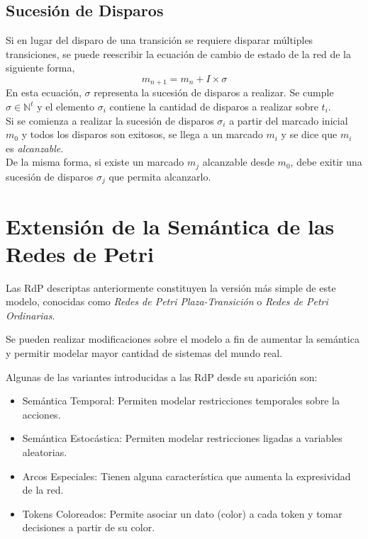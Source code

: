 \subsection{Sucesión de Disparos}

Si en lugar del disparo de una transición se requiere disparar múltiples
transiciones, se puede reescribir la ecuación de cambio de estado de la red de
la siguiente forma,
$$ m_{n+1} = m_{n} + I \times \sigma $$
En esta ecuación, $\sigma$ representa la sucesión de disparos a realizar. Se
cumple $\sigma \in \mathbb{N}^{t}$ y el elemento $\sigma_{i}$ contiene la
cantidad de disparos a realizar sobre $t_{i}$.\\
Si se comienza a realizar la sucesión de disparos $\sigma_{i}$ a partir del
marcado inicial $m_{0}$ y todos los disparos son exitosos, se llega a un marcado
$m_{i}$ y se dice que $m_{i}$ es \textit{alcanzable}.\\
De la misma forma, si existe un marcado $m_{j}$ alcanzable desde $m_{0}$, debe
exitir una sucesión de disparos $\sigma_{j}$ que permita alcanzarlo.

\section{Extensión de la Semántica de las Redes de Petri}

Las RdP descriptas anteriormente constituyen la versión más simple de este
modelo, conocidas como \textit{Redes de Petri Plaza-Transición} o \textit{Redes
de Petri Ordinarias}.

Se pueden realizar modificaciones sobre el modelo a fin de aumentar la semántica
y permitir modelar mayor cantidad de sistemas del mundo real.

Algunas de las variantes introducidas a las RdP desde su aparición son:
\begin{itemize}
  \item Semántica Temporal: Permiten modelar restricciones temporales sobre la
  acciones.
  \item Semántica Estocástica: Permiten modelar restricciones ligadas a 
  variables aleatorias.
  \item Arcos Especiales: Tienen alguna característica que aumenta la
  expresividad de la red.
  \item Tokens Coloreados: Permite asociar un dato (color) a cada token y tomar
  decisiones a partir de su color.
\end{itemize}
\cite{PetriNetsFundamentals}

